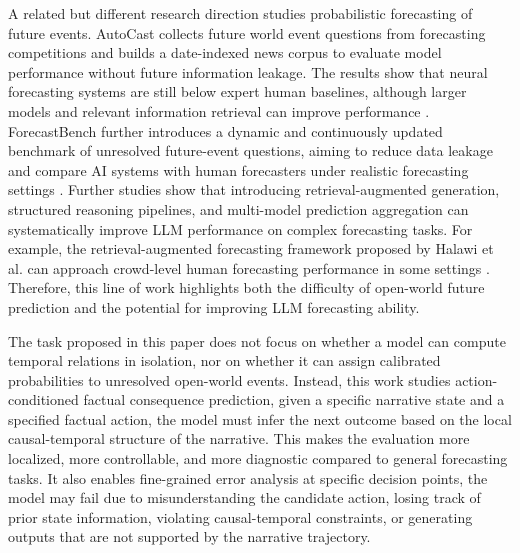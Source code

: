 \documentclass[pdflatex,sn-mathphys-num]{sn-jnl}%
\theoremstyle{thmstyleone}%
\theoremstyle{thmstyletwo}%
\theoremstyle{thmstylethree}%
\begin{document}
A related but different research direction studies probabilistic forecasting of future events. AutoCast collects future world event questions from forecasting competitions and builds a date-indexed news corpus to evaluate model performance without future information leakage. The results show that neural forecasting systems are still below expert human baselines, although larger models and relevant information retrieval can improve performance \cite{zou2022forecasting}. ForecastBench further introduces a dynamic and continuously updated benchmark of unresolved future-event questions, aiming to reduce data leakage and compare AI systems with human forecasters under realistic forecasting settings \cite{karger2024forecastbench}. Further studies show that introducing retrieval-augmented generation, structured reasoning pipelines, and multi-model prediction aggregation can systematically improve LLM performance on complex forecasting tasks. For example, the retrieval-augmented forecasting framework proposed by Halawi et al. can approach crowd-level human forecasting performance in some settings \cite{halawi2024approaching}. Therefore, this line of work highlights both the difficulty of open-world future prediction and the potential for improving LLM forecasting ability.

The task proposed in this paper does not focus on whether a model can compute temporal relations in isolation, nor on whether it can assign calibrated probabilities to unresolved open-world events. Instead, this work studies action-conditioned factual consequence prediction, given a specific narrative state and a specified factual action, the model must infer the next outcome based on the local causal-temporal structure of the narrative. This makes the evaluation more localized, more controllable, and more diagnostic compared to general forecasting tasks. It also enables fine-grained error analysis at specific decision points, the model may fail due to misunderstanding the candidate action, losing track of prior state information, violating causal-temporal constraints, or generating outputs that are not supported by the narrative trajectory.
\end{document}
